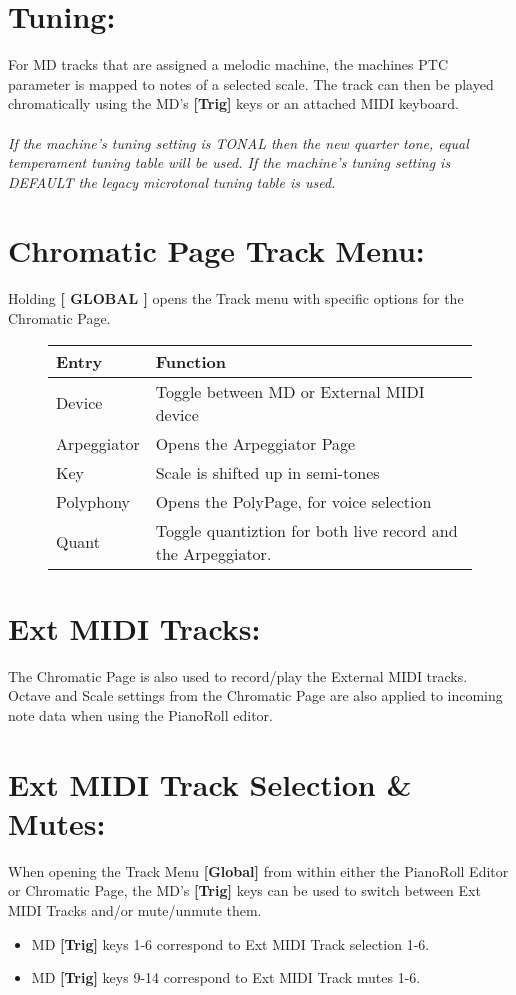 \section{Tuning:}
For MD tracks that are assigned a melodic machine, the machines PTC parameter is mapped to notes of a selected scale. The track can then be played chromatically using the MD's \textbf{[Trig]} keys or an attached MIDI keyboard.\\\\
\textit{If the machine's tuning setting is TONAL then the new quarter tone, equal temperament tuning table will be used. If the machine's tuning setting is DEFAULT the legacy microtonal tuning table is used.}
\newpage
\section{Chromatic Page Track Menu:}
Holding \textbf{[ GLOBAL ]} opens the Track menu with specific options for the Chromatic Page.
\begin{figure}[hb]
    \begin{tabular}{|l|l|}
    \hline
    \rowcolor[HTML]{C0C0C0} 
    Entry            & Function \\ \hline
    Device           & Toggle between MD or External MIDI device\\ \hline
    Arpeggiator      & Opens the Arpeggiator Page \\ \hline
    Key              & Scale is shifted up in semi-tones\\ \hline
    Polyphony        & Opens the PolyPage, for voice selection\\ \hline
    Quant            & Toggle quantiztion for both live record and the Arpeggiator.\\ \hline
    \end{tabular}
\end{figure}
\section{Ext MIDI Tracks:}
The Chromatic Page is also used to record/play the External MIDI tracks.
Octave and Scale settings from the Chromatic Page are also applied to incoming note data when using the PianoRoll editor.
\section{Ext MIDI Track Selection \& Mutes:}
When opening the Track Menu \textbf{[Global]}  from within either the PianoRoll Editor or Chromatic Page, the MD's \textbf{[Trig]} keys can be used to switch between Ext MIDI Tracks and/or  mute/unmute them.
\begin{itemize}
    \item MD \textbf{[Trig]} keys 1-6 correspond to Ext MIDI Track selection 1-6.
    \item MD \textbf{[Trig]} keys 9-14 correspond to Ext MIDI Track mutes 1-6.
\end{itemize}

